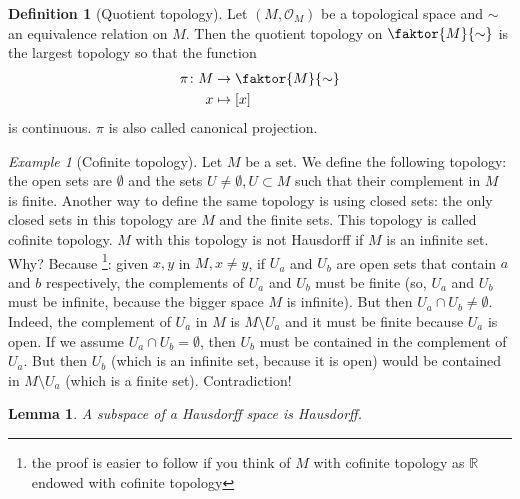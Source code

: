 \documentclass[a4paper,11pt,titlepage]{article}
\numberwithin{equation}{section}
\newtheorem{lemma}[theorem]{Lemma}
\theoremstyle{definition}
\newtheorem{definition}[theorem]{Definition}
\theoremstyle{remark}
\newtheorem{example}[theorem]{Example}
\newcommand{\rfield}{\mathbb{R}}
\begin{document}
\begin{definition}[Quotient topology]
Let $(M, \mathcal{O}_M)$ be a topological space and $\sim$ an equivalence relation on $M$. Then the quotient topology on $\faktor{M}{\sim}$ is the largest topology so that the function 
\begin{align*}
\pi \colon M &\rightarrow \faktor{M}{\sim} \\
x &\mapsto [x]
\end{align*}
is continuous. $\pi$ is also called canonical projection.
\end{definition}

\begin{example}[Cofinite topology]
Let $M$ be a set. We define the following topology: the open sets are $\emptyset$ and the sets $U \not = \emptyset, U \subset M$ such that their complement in $M$ is finite. Another way to define the same topology is using closed sets: the only closed sets in this topology are $M$ and the finite sets. This topology is called cofinite topology. 
$M$ with this topology is not Hausdorff if $M$ is an infinite set. 
Why? Because \footnote{the proof is easier to follow if you think of $M$ with cofinite topology as $\rfield$ endowed with cofinite topology}: given $x, y$ in $M, x \not = y$, if $U_a$ and $U_b$ are open sets that contain $a$ and $b$ respectively, the complements of $U_a$ and $U_b$ must be finite (so, $U_a$ and $U_b$ must be infinite, because the bigger space $M$ is infinite). 
But then $U_a \cap U_b \not = \emptyset$. Indeed, the complement of $U_a$ in $M$ is $M \setminus U_a$ and it must be finite because $U_a$ is open. 
If we assume $U_a \cap U_b = \emptyset$, then $U_b$ must be contained in the complement of $U_a$. But then $U_b$ (which is an infinite set, because it is open) would be contained in $M \setminus U_a$ (which is a finite set). Contradiction! 
\end{example}

\begin{lemma}
A subspace of a Hausdorff space is Hausdorff.
\end{lemma}
\end{document}
